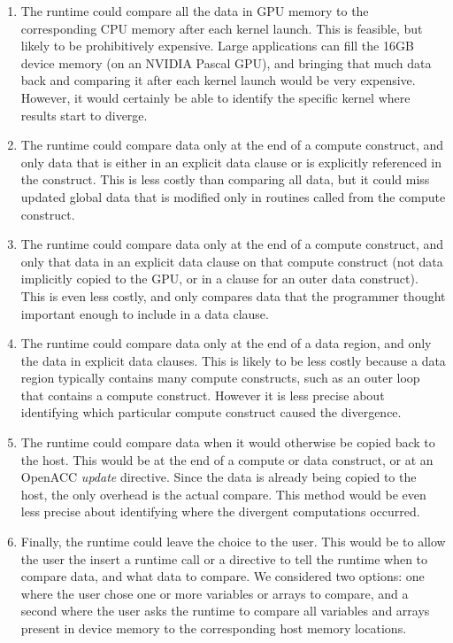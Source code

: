 \begin{enumerate}
\item The runtime could compare all the data in GPU memory to the corresponding CPU memory after each kernel launch.
This is feasible, but likely to be prohibitively expensive.
Large applications can fill the 16GB device memory (on an NVIDIA Pascal GPU), and bringing that much data back and comparing it after each kernel launch would be very expensive.
However, it would certainly be able to identify the specific kernel where results start to diverge.

\item The runtime could compare data only at the end of a compute construct, and only data that is either in an explicit data clause or is explicitly referenced in the construct.
This is less costly than comparing all data, but it could miss updated global data that is modified only in routines called from the compute construct.

\item The runtime could compare data only at the end of a compute construct, and only that data in an explicit data clause on that compute construct (not data implicitly copied to the GPU, or in a clause for an outer data construct).
This is even less costly, and only compares data that the programmer thought important enough to include in a data clause.

\item The runtime could compare data only at the end of a data region, and only the data in explicit data clauses.
This is likely to be less costly because a data region typically contains many compute constructs, such as an outer loop that contains a compute construct.
However it is less precise about identifying which particular compute construct caused the divergence.

\item The runtime could compare data when it would otherwise be copied back to the host.
This would be at the end of a compute or data construct, or at an OpenACC \emph{update} directive.
Since the data is already being copied to the host, the only overhead is the actual compare.
This method would be even less precise about identifying where the divergent computations occurred.

\item Finally, the runtime could leave the choice to the user.
This would be to allow the user the insert a runtime call or a directive to tell the runtime when to compare data, and what data to compare.
We considered two options: one where the user chose one or more variables or arrays to compare, and a second where the user asks the runtime to compare all variables and arrays present in device memory to the corresponding host memory locations.
\end{enumerate}

